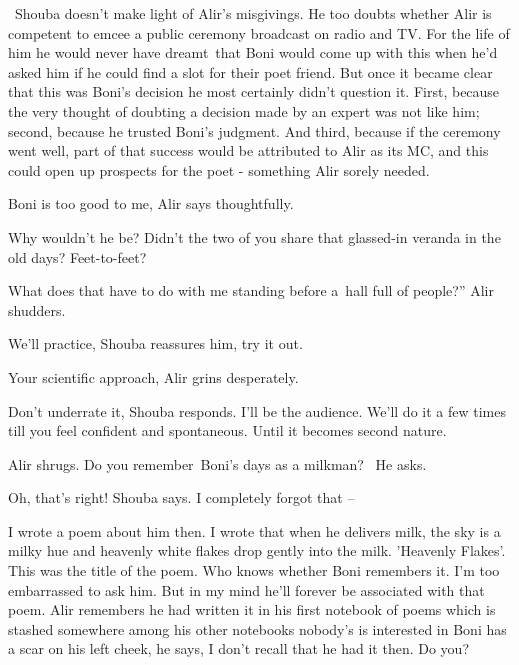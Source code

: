 \documentclass[letterpaper]{article}
\begin{document}
~Shouba doesn't make light of Alir's misgivings. He too doubts whether Alir is competent to emcee a public ceremony
broadcast on radio and TV. For the life of him he would never have dreamt~that Boni would come up with this when he'd
asked him if he could find a slot for their poet friend. But once it became clear that this was Boni's decision he most
certainly didn't question it. First, because the very thought of doubting a decision made by an expert was not like
him; second, because he trusted Boni's judgment. And third, because if the ceremony went well, part of that success
would be attributed to Alir as its MC, and this could open up prospects for the poet - something Alir sorely needed.

{\textquotedbl}Boni is too good to me,{\textquotedbl} Alir says thoughtfully.

{\textquotedbl}Why wouldn't he be? Didn't the two of you share that glassed-in veranda in the old days?
Feet-to-feet?{\textquotedbl}

{\textquotedbl}What does that have to do with me standing before a~hall full of people?'' Alir shudders. 

{\textquotedbl}We'll practice,{\textquotedbl} Shouba reassures him, {\textquotedbl}try it out.{\textquotedbl} 

{\textquotedbl}Your scientific approach,{\textquotedbl} Alir grins desperately. 

{\textquotedbl}Don't underrate it,{\textquotedbl} Shouba responds. {\textquotedbl}I'll be the audience. We'll do it a
few times till you feel confident and spontaneous. Until it becomes second nature.{\textquotedbl} 

Alir shrugs. {\textquotedbl}Do you remember~Boni's days as a milkman?{\textquotedbl} \ He asks. 

{\textquotedbl}Oh, that's right!{\textquotedbl} Shouba says. {\textquotedbl}I completely forgot that --{\textquotedbl}

{\textquotedbl}I wrote a poem about him then. I wrote that when he delivers milk, the sky is a milky hue and heavenly
white flakes drop gently into the milk. 'Heavenly Flakes'. This was the title of the poem. Who knows whether Boni
remembers it. I'm too embarrassed to ask him. But in my mind he'll forever be associated with that poem.{\textquotedbl}
Alir remembers he had written it in his first notebook of poems which is stashed somewhere among his other notebooks
nobody's is interested in {\textquotedbl}Boni has a scar on his left cheek,{\textquotedbl} he says, {\textquotedbl}I
don't recall that he had it then. Do you?{\textquotedbl} \ 
\end{document}
